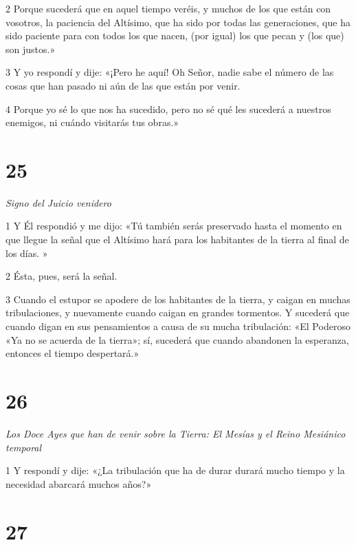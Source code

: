 \par 2 Porque sucederá que en aquel tiempo veréis, y muchos de los que están con vosotros, la paciencia del Altísimo, que ha sido por todas las generaciones, que ha sido paciente para con todos los que nacen, (por igual) los que pecan y (los que) son justos.»

\par 3 Y yo respondí y dije: «¡Pero he aquí! Oh Señor, nadie sabe el número de las cosas que han pasado ni aún de las que están por venir.

\par 4 Porque yo sé lo que nos ha sucedido, pero no sé qué les sucederá a nuestros enemigos, ni cuándo visitarás tus obras.»

\chapter{25}

\par \textit{Signo del Juicio venidero}

\par 1 Y Él respondió y me dijo: «Tú también serás preservado hasta el momento en que llegue la señal que el Altísimo hará para los habitantes de la tierra al final de los días. »

\par 2 Ésta, pues, será la señal.

\par 3 Cuando el estupor se apodere de los habitantes de la tierra, y caigan en muchas tribulaciones, y nuevamente cuando caigan en grandes tormentos. Y sucederá que cuando digan en sus pensamientos a causa de su mucha tribulación: «El Poderoso «Ya no se acuerda de la tierra»; sí, sucederá que cuando abandonen la esperanza, entonces el tiempo despertará.»

\chapter{26}

\par \textit{Los Doce Ayes que han de venir sobre la Tierra: El Mesías y el Reino Mesiánico temporal}

\par 1 Y respondí y dije: «¿La tribulación que ha de durar durará mucho tiempo y la necesidad abarcará muchos años?»

\chapter{27}

